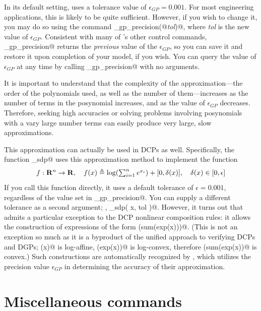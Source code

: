 \documentclass[12pt]{article}
\begin{document}
In its default setting, \cvx uses a tolerance value of $\epsilon_{GP}=0.001$.
For most engineering applications, this is likely to be quite sufficient. However,
if you wish to change it, you may do so using the command \verb@cvx_gp_precision(@\emph{tol}\verb@)@,
where \emph{tol} is the new value of $\epsilon_{GP}$. Consistent with many
of \cvx's other control commands, \verb@cvx_gp_precision@ returns the \emph{previous}
value of the $\epsilon_{GP}$, so you can save it and restore it upon completion
of your model, if you wish. You can query the value of $\epsilon_{GP}$ at any
time by calling \verb@cvx_gp_precision@ with no arguments.

It is important to understand that the complexity of the approximation---the order of
the polynomials used, as well as the number of them---increases as the
number of terms in the posynomial increases, and as the value of $\epsilon_{GP}$
decreases. Therefore, seeking high accuracies or solving problems involving 
posynomials with a vary large number terms can easily produce very large, slow
approximations.

This approximation can actually be used in DCPs as well.
Specifically, the function \verb@logsumexp_sdp@ uses this approximation
method to implement the function
\begin{equation}
	f:\Rn\rightarrow\R, \quad f(x) \eqbydef \log(\TS\sum_{i=1}^n e^{x_i}) + [0,\delta(x)], \quad \delta(x)\in[0,\epsilon]
\end{equation}
If you call this function directly, it uses a default tolerance of $\epsilon=0.001$, regardless
of the value set in \verb@cvx_gp_precision@. You can supply a different tolerance as a second
argument; \ie, \verb@logsumexp_sdp( x, tol )@. However, it turns out that \cvx admits a 
particular exception to the DCP nonlinear composition rules: it allows the construction
of expressions of the form \verb@log(sum(exp(x)))@. (This is not an exception so much
as it is a byproduct of the unified approach to verifying DCPs and DGPs; \verb@exp(x)@
is log-affine, \verb@sum(exp(x))@ is log-convex, therefore \verb@log(sum(exp(x))@ is convex.) 
Such constructions are automatically recognized by \cvx, which utilizes the
precision value $\epsilon_{GP}$ in determining the accuracy of their approximation.

\section{Miscellaneous \cvx commands}
\end{document}
